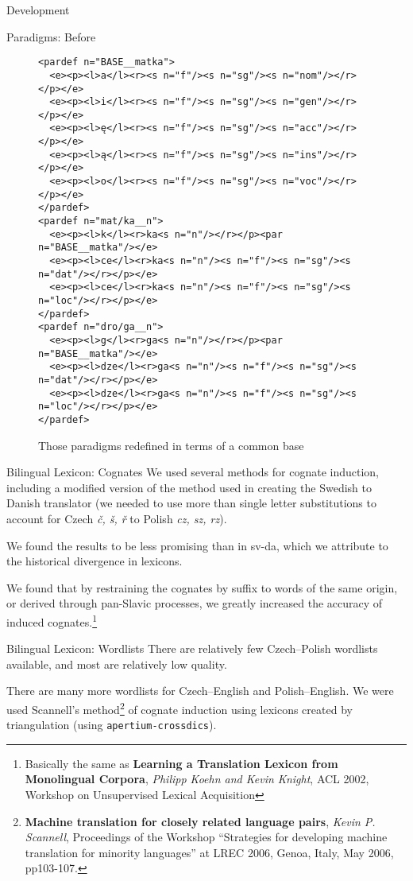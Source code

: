 \documentclass{beamer}
\begin{document}
\begin{section}{Development}
\begin{frame}[fragile]{Paradigms: Before}
\begin{figure}
\begin{tiny}
\begin{verbatim}
<pardef n="BASE__matka">
  <e><p><l>a</l><r><s n="f"/><s n="sg"/><s n="nom"/></r></p></e>
  <e><p><l>i</l><r><s n="f"/><s n="sg"/><s n="gen"/></r></p></e>
  <e><p><l>ę</l><r><s n="f"/><s n="sg"/><s n="acc"/></r></p></e>
  <e><p><l>ą</l><r><s n="f"/><s n="sg"/><s n="ins"/></r></p></e>
  <e><p><l>o</l><r><s n="f"/><s n="sg"/><s n="voc"/></r></p></e>
</pardef>
<pardef n="mat/ka__n">
  <e><p><l>k</l><r>ka<s n="n"/></r></p><par n="BASE__matka"/></e>
  <e><p><l>ce</l><r>ka<s n="n"/><s n="f"/><s n="sg"/><s n="dat"/></r></p></e>
  <e><p><l>ce</l><r>ka<s n="n"/><s n="f"/><s n="sg"/><s n="loc"/></r></p></e>
</pardef>
<pardef n="dro/ga__n">
  <e><p><l>g</l><r>ga<s n="n"/></r></p><par n="BASE__matka"/></e>
  <e><p><l>dze</l><r>ga<s n="n"/><s n="f"/><s n="sg"/><s n="dat"/></r></p></e>
  <e><p><l>dze</l><r>ga<s n="n"/><s n="f"/><s n="sg"/><s n="loc"/></r></p></e>
</pardef>
\end{verbatim}
\end{tiny}
\caption{Those paradigms redefined in terms of a common base}
\end{figure}
\end{frame}

\begin{frame}{Bilingual Lexicon: Cognates}
We used several methods for cognate induction, including a modified version of
the method used in creating the Swedish to Danish translator (we needed to use
more than single letter substitutions to account for Czech \textit{\v{c}, \v{s}, 
\v{r}} to Polish \textit{cz, sz, rz}).

We found the results to be less promising than in sv-da, which we attribute
to the historical divergence in lexicons.

We found that by restraining the cognates by suffix to words of the same origin,
or derived through pan-Slavic processes, we greatly increased the accuracy of
induced cognates.\footnote{Basically the same as \textbf{Learning a Translation 
Lexicon from Monolingual Corpora}, \textit{Philipp Koehn and Kevin Knight}, ACL 
2002, Workshop on Unsupervised Lexical Acquisition}
\end{frame}

\begin{frame}{Bilingual Lexicon: Wordlists}
There are relatively few Czech--Polish wordlists available, and most 
are relatively low quality. 

There are many more wordlists for Czech--English and Polish--English. We 
were used Scannell's method\footnote{\textbf{Machine translation 
for closely related language pairs}, \textit{Kevin P. Scannell},
Proceedings of the Workshop ``Strategies for developing machine 
translation for minority languages'' at LREC 2006, Genoa, Italy, 
May 2006, pp103-107.} of cognate induction using lexicons created
by triangulation (using \texttt{apertium-crossdics}). 
\end{frame}
\end{section}
\end{document}
